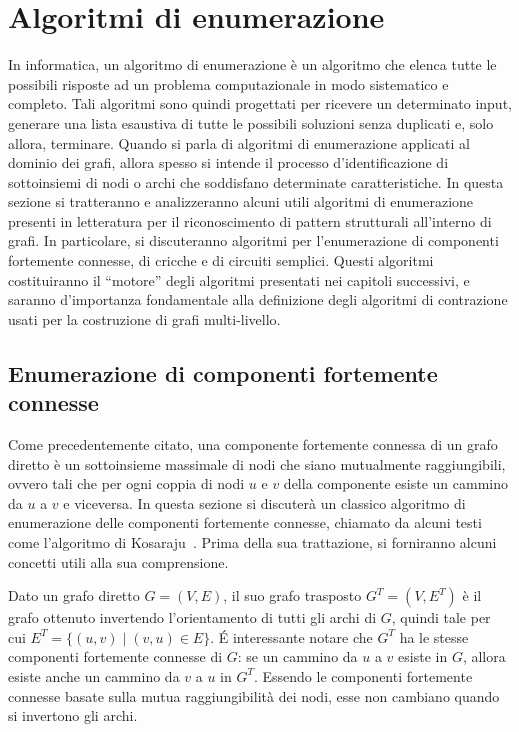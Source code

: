 \section{Algoritmi di enumerazione}\label{sec:algoritmi-di-enumerazione}

In informatica, un algoritmo di enumerazione \`e un algoritmo che elenca tutte le possibili risposte ad un
problema computazionale in modo sistematico e completo. Tali algoritmi sono quindi progettati per ricevere un
determinato input, generare una lista esaustiva di tutte le possibili soluzioni senza duplicati e, solo allora,
terminare.
Quando si parla di algoritmi di enumerazione applicati al dominio dei grafi, allora spesso si intende il processo
d'identificazione di sottoinsiemi di nodi o archi che soddisfano determinate caratteristiche.
In questa sezione si tratteranno e analizzeranno alcuni utili algoritmi di enumerazione presenti in letteratura per
il riconoscimento di pattern strutturali all'interno di grafi.
In particolare, si discuteranno algoritmi per l'enumerazione di componenti fortemente connesse, di cricche e di
circuiti semplici.
Questi algoritmi costituiranno il ``motore'' degli algoritmi presentati nei capitoli successivi, e saranno
d'importanza fondamentale alla definizione degli algoritmi di contrazione usati per la costruzione di grafi multi-livello.

\subsection{Enumerazione di componenti fortemente connesse}\label{subsec:enumerazione-di-componenti-fortemente-connesse}

Come precedentemente citato, una componente fortemente connessa di un grafo diretto \`e un sottoinsieme massimale
di nodi che siano mutualmente raggiungibili, ovvero tali che per ogni coppia di nodi $u$ e $v$ della componente esiste
un cammino da $u$ a $v$ e viceversa.
In questa sezione si discuter\`a un classico algoritmo di enumerazione delle componenti fortemente connesse, chiamato
da alcuni testi come l'algoritmo di Kosaraju~\cite{SHARIR198167}.
Prima della sua trattazione, si forniranno alcuni concetti utili alla sua comprensione.


Dato un grafo diretto $G = (V, E)$, il suo grafo trasposto $G^T = (V, E^T)$ \`e il grafo ottenuto invertendo
l'orientamento di tutti gli archi di $G$, quindi tale per cui $E^T = \{(u, v) \mid (v, u) \in E\}$.
 \'E interessante notare che $G^T$ ha le stesse componenti fortemente connesse di $G$: se un cammino da $u$ a $v$
esiste in $G$, allora esiste anche un cammino da $v$ a $u$ in $G^T$.
Essendo le componenti fortemente connesse basate sulla mutua raggiungibilit\`a dei nodi, esse non cambiano
quando si invertono gli archi.

